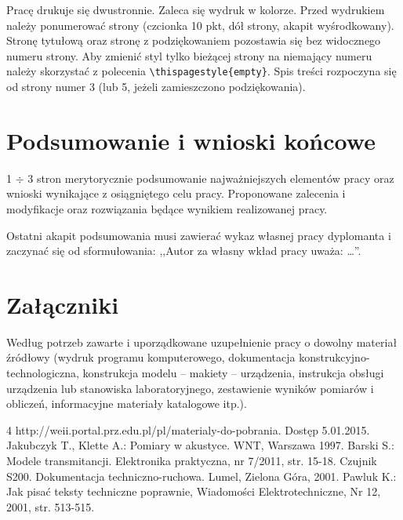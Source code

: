 \documentclass[12pt,twoside,openright]{article}
\begin{document}
Pracę drukuje się dwustronnie. Zaleca się wydruk w kolorze. Przed wydrukiem
należy ponumerować strony (czcionka 10 pkt, dół strony, akapit wyśrodkowany).
Stronę tytułową oraz stronę z podziękowaniem pozostawia się bez widocznego numeru strony.
Aby zmienić styl tylko bieżącej strony na niemający numeru należy skorzystać z polecenia \verb|\thispagestyle{empty}|.
Spis treści rozpoczyna się od strony numer 3 (lub 5, jeżeli zamieszczono podziękowania).


\section{Podsumowanie i wnioski końcowe}

1 $\div$ 3 stron merytorycznie podsumowanie najważniejszych elementów pracy oraz wnioski wynikające z osiągniętego celu pracy. Proponowane zalecenia i modyfikacje oraz rozwiązania będące wynikiem realizowanej pracy.

Ostatni akapit podsumowania musi zawierać wykaz własnej pracy dyplomanta i zaczynać się od sformułowania: ,,Autor za własny wkład pracy uważa: \ldots''.


\section*{Załączniki}

Według potrzeb zawarte i uporządkowane uzupełnienie pracy o dowolny materiał źródłowy (wydruk programu komputerowego, dokumentacja kons\-truk\-cyj\-no-\-tech\-no\-lo\-gicz\-na, konstrukcja modelu -- makiety -- urządzenia, instrukcja obsługi urządzenia lub stanowiska laboratoryjnego, zestawienie wyników pomiarów i obliczeń, informacyjne materiały katalogowe itp.).


\clearpage


\begin{thebibliography}{4}
 http://weii.portal.prz.edu.pl/pl/materialy-do-pobrania. Dostęp 5.01.2015.
 Jakubczyk T., Klette A.: Pomiary w akustyce. WNT, Warszawa 1997.
 Barski S.: Modele transmitancji. Elektronika praktyczna, nr 7/2011, str. 15-18.
 Czujnik S200. Dokumentacja techniczno-ruchowa. Lumel, Zielona Góra, 2001.
 Pawluk K.: Jak pisać teksty techniczne poprawnie, Wiadomości Elektrotechniczne, Nr 12, 2001, str. 513-515.
\end{thebibliography}

\clearpage

\makesummary
\end{document}
